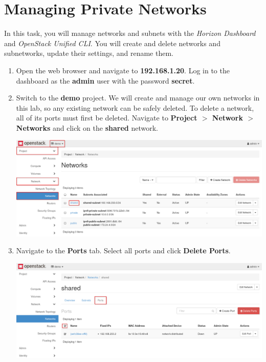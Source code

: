 \documentclass[letterpaper, 12pt]{article}
\begin{document}
\section{Managing Private Networks}
\label{sec:managing_private_networks}
In this task, you will manage networks and subnets with the \textit{Horizon Dashboard} and \textit{OpenStack Unified CLI}.
You will create and delete networks and subnetworks, update their settings, and rename them.

\begin{enumerate}
    \item Open the web browser and navigate to \textbf{192.168.1.20}.
    Log in to the dashboard as the \textbf{admin} user with the password \textbf{secret}.

    \item Switch to the \textbf{demo} project.
    We will create and manage our own networks in this lab, so any existing network can be safely deleted.
    To delete a network, all of its ports must first be deleted.
    Navigate to \textbf{Project $>$ Network $>$ Networks} and click on the \textbf{shared} network.

    \begin{center}
        \includegraphics[width=\linewidth]{images/part3/step2.png}
    \end{center}

    \item Navigate to the \textbf{Ports} tab.
    Select all ports and click \textbf{Delete Ports}.

    \begin{center}
        \includegraphics[width=\linewidth]{images/part3/step3.png}
    \end{center}


\end{enumerate}
\end{document}
